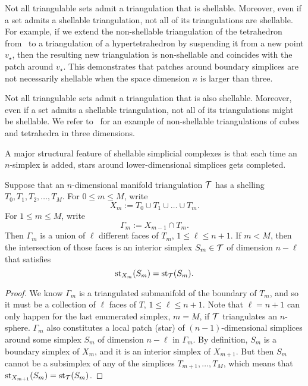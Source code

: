\documentclass[10pt,a4paper]{article}
\begin{document}
\begin{remark}
    Not all triangulable sets admit a triangulation that is shellable. 
    Moreover, even if a set admits a shellable triangulation, not all of its triangulations are shellable. For example, if we extend the non-shellable triangulation of the tetrahedron from~\cite[Example 8.9]{ziegler1995lectures} to a triangulation of a hypertetrahedron by suspending it from a new point $v_\star$, then the resulting new triangulation is non-shellable and coincides with the patch around $v_\star$.
    This demonstrates that patches around boundary simplices are not necessarily shellable when the space dimension $n$ is larger than three.
\end{remark}
\begin{remark}
    Not all triangulable sets admit a triangulation that is also shellable. 
    Moreover, even if a set admits a shellable triangulation, not all of its triangulations might be shellable. 
    We refer to~\cite[Example 8.9]{ziegler1995lectures} for an example of non-shellable triangulations of cubes and tetrahedra in three dimensions. 
\end{remark}


A major structural feature of shellable simplicial complexes is that each time an $n$-simplex is added, stars around lower-dimensional simplices gets completed. 

\begin{lemma}\label{lemma:existenceofstar}
    Suppose that an $n$-dimensional manifold triangulation ${\mathcal T}$ has a shelling $T_{0}, T_{1}, T_{2}, \dots, T_{M}$.
    For $0 \leq m \leq M$, write 
    $$
        X_{m} := T_{0} \cup T_{1} \cup \dots \cup T_{m}.
    $$ 
    For $1 \leq m \leq M$, write 
    $$
        \Gamma_{m} := X_{m-1} \cap T_{m}.
    $$ 
    Then $\Gamma_{m}$ is a union of $\ell$ different faces of $T_{m}$, $1 \leq \ell \leq n+1$.
    If $m < M$, then the intersection of those faces is an interior simplex $S_{m} \in {\mathcal T}$ of dimension $n-\ell$ that satisfies 
    $$
        \operatorname{st}_{X_{m}}(S_{m}) = \operatorname{st}_{{\mathcal T}}(S_{m}).
    $$
\end{lemma}
\begin{proof}
    We know $\Gamma_{m}$ is a triangulated submanifold of the boundary of $T_{m}$, 
    and so it must be a collection of $\ell$ faces of $T$, $1 \leq \ell \leq n+1$.
    Note that $\ell = n + 1$ can only happen for the last enumerated simplex, $m = M$, if ${\mathcal T}$ triangulates an $n$-sphere. 
    $\Gamma_{m}$ also constitutes a local patch (star) of $(n-1)$-dimensional simplices around some simplex $S_{m}$ of dimension $n-\ell$ in $\Gamma_{m}$.
    By definition, $S_{m}$ is a boundary simplex of $X_{m}$, 
    and it is an interior simplex of $X_{m+1}$. 
    But then $S_{m}$ cannot be a subsimplex of any of the simplices $T_{m+1}, \dots, T_{M}$,
    which means that $\operatorname{st}_{X_{m+1}}(S_{m}) = \operatorname{st}_{{\mathcal T}}(S_{m})$. 
\end{proof}
\end{document}
